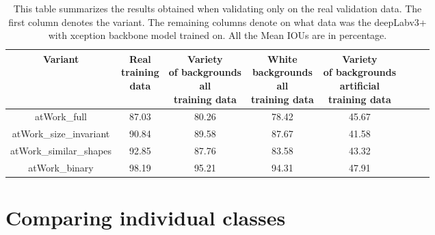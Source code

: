 \begin{table}
	\centering
	\begin{tabular}{|c|c|c|c|c|c|c|c|}
	\hline 
    Variant & \makecell{Real \\training \\data} & \makecell{Variety\\ of backgrounds\\ all \\training data} & \makecell{White \\backgrounds\\ all \\training data} & \makecell{Variety\\ of backgrounds\\ artificial \\training data} \\ 
	\hline 
	atWork\_full & 87.03 & 80.26 & 78.42 & 45.67 \\ 
	\hline 
	atWork\_size\_invariant & 90.84 & 89.58 & 87.67 & 41.58 \\ 
	\hline 
	atWork\_similar\_shapes & 92.85 & 87.76 & 83.58 & 43.32 \\ 
	\hline 
	atWork\_binary & 98.19 & 95.21 & 94.31 & 47.91 \\ 
	\hline 
	\end{tabular}
	\caption{This table summarizes the results obtained when validating only on the real validation data. The first column denotes the variant. The remaining columns denote on what data was the deepLabv3+ with xception backbone model trained on. All the Mean IOUs are in percentage.} 
	\label{Table:realvalxcep}
\end{table}

\section{Comparing individual classes}

